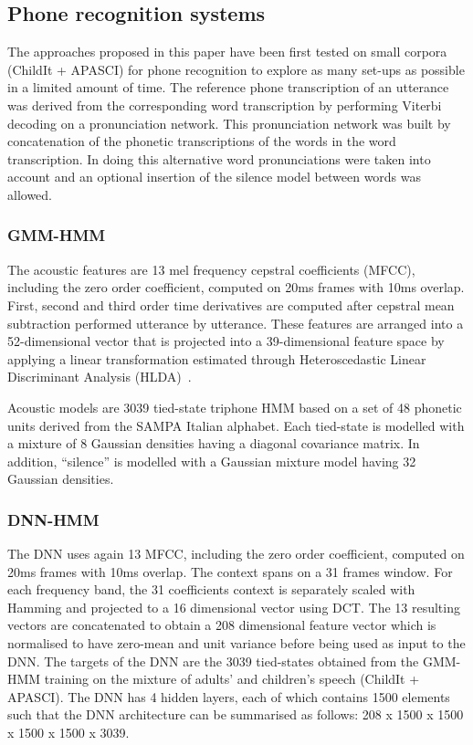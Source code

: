 \documentclass{nle}
\begin{document}
\subsection{Phone recognition systems}
The approaches proposed in this paper have been first tested on small
corpora (ChildIt + APASCI) for phone recognition to explore as many
set-ups as possible in a limited amount of time.  The
reference phone transcription of an utterance was derived from the
corresponding word transcription by performing Viterbi decoding on a
pronunciation network.  This pronunciation network was built by
concatenation of the phonetic transcriptions of the words in the word
transcription.  In doing this alternative word pronunciations were
taken into account and an optional insertion of the silence model
between words was allowed.

\subsubsection{GMM-HMM}\label{sssection:base}

The  acoustic  features are  13  mel  frequency cepstral  coefficients
(MFCC), including the zero order coefficient, computed on 20ms frames
with 10ms overlap.  First, second and third order time derivatives are
computed  after  cepstral  mean  subtraction  performed  utterance  by
utterance.  These  features are arranged into  a 52-dimensional vector
that is  projected into a  39-dimensional feature space by  applying a
linear   transformation  estimated   through   Heteroscedastic  Linear
Discriminant Analysis (HLDA)~\citep*{Kumar1998283}.

Acoustic models  are 3039 tied-state  triphone HMM
based on  a set of  48 phonetic units  derived from the  SAMPA Italian
alphabet.  Each  tied-state  is modelled with  a mixture of  8 Gaussian
densities   having  a  diagonal   covariance  matrix.    In  addition,
``silence''  is  modelled  with  a  Gaussian mixture  model  having  32
Gaussian densities.

\subsubsection{DNN-HMM}\label{sssection:exp:DNN}
The DNN  uses again  13 MFCC, including  the zero  order coefficient,
computed on 20ms  frames with 10ms overlap. The context  spans on a 31
frames  window. For each frequency band, the 31 coefficients context is separately scaled with Hamming and projected to a 16 dimensional vector using DCT. The 13 resulting vectors are concatenated to obtain a 208 dimensional feature  vector which is normalised to have zero-mean and unit variance before being used as input to the DNN. The targets of the
DNN are the 3039 tied-states obtained from the GMM-HMM training on the
mixture of adults'  and children's speech (ChildIt +  APASCI). The DNN
has 4  hidden layers, each of  which contains 1500  elements such that
the DNN architecture can be summarised as follows: 208 x 1500 x 1500 x
1500 x 1500 x 3039.
\end{document}

